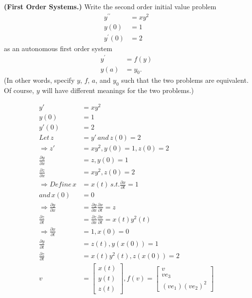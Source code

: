 \textbf{(First Order Systems.)} Write the second order initial value
problem
\begin{align}
y^{\prime\prime} &= xy^2 \\
y(0) &= 1 \\
y^\prime(0) &= 2
\end{align}
as an autonomous first order system
\begin{align}
  y^\prime &= f(y)\\
y(a) &= y_0.
\end{align}
(In other words, specify $y$, $f$, $a$, and $y_0$ such that the two
problems are equivalent. Of course, $y$ will have different meanings
for the two problems.)


{\color{blue}
\begin{align*}

y'&=xy^2\\
y(0)&=1\\
y'(0)&=2\\
Let\, z&=y' \, and \, z(0)=2\\
\Rightarrow z'&=xy^2, y(0)=1, z(0)=2\\

\frac{\partial y}{\partial x}&=z, y(0)=1\\
\frac{\partial z}{\partial x}&=xy^2, z(0)=2\\
\Rightarrow Define\, x&=x(t)\, s.t.\frac{\partial x}{\partial t}=1\\
and\,x(0)&=0\\
\Rightarrow \frac{\partial y}{\partial x}&=\frac{\partial y}{\partial x}\frac{\partial x}{\partial t}=z\\
\frac{\partial z}{\partial t}&=\frac{\partial z}{\partial x}\frac{\partial x}{\partial t}=x(t)y^2(t)\\
\Rightarrow \frac{\partial x}{\partial t}&=1, x(0)=0\\
\frac{\partial y}{\partial t}&=z(t), y(x(0))=1\\
\frac{\partial z}{\partial t}&=x(t)y^2(t), z(x(0))=2\\

v&=\begin{bmatrix}
x(t)\\ 
y(t)\\ 
z(t)
\end{bmatrix}, 

f(v)=\begin{bmatrix}
v\\ 
ve_3\\ 
(ve_1)(ve_2)^2
\end{bmatrix}\\


\end{align*}}
